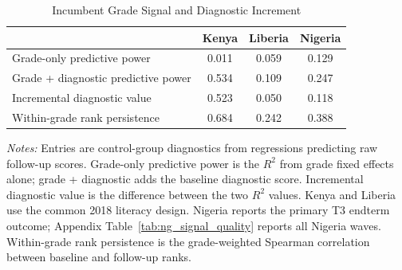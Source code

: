 \begin{table}[H]
\centering
\caption{Incumbent Grade Signal and Diagnostic Increment}
\label{tab:grade_signal_substitution}
\begin{threeparttable}
\begin{tabular}[t]{lccc}
\toprule
 & Kenya & Liberia & Nigeria \\
\midrule
Grade-only predictive power & 0.011 & 0.059 & 0.129 \\
Grade + diagnostic predictive power & 0.534 & 0.109 & 0.247 \\
Incremental diagnostic value & 0.523 & 0.050 & 0.118 \\
Within-grade rank persistence & 0.684 & 0.242 & 0.388 \\
\bottomrule
\end{tabular}
\begin{tablenotes}
\footnotesize
\item \textit{Notes:} Entries are control-group diagnostics from regressions predicting raw follow-up scores. Grade-only predictive power is the $R^2$ from grade fixed effects alone; grade + diagnostic adds the baseline diagnostic score. Incremental diagnostic value is the difference between the two $R^2$ values. Kenya and Liberia use the common 2018 literacy design. Nigeria reports the primary T3 endterm outcome; Appendix Table~\ref{tab:ng_signal_quality} reports all Nigeria waves. Within-grade rank persistence is the grade-weighted Spearman correlation between baseline and follow-up ranks.
\end{tablenotes}
\end{threeparttable}
\end{table}
